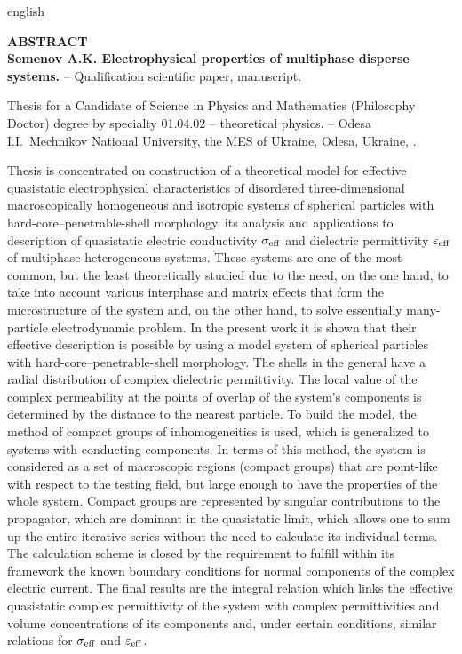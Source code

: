 \begin{otherlanguage*}{english}
\begin{center}
    {\normalfont \textbf{
    	ABSTRACT\\
    	Semenov A.K. Electrophysical properties of multiphase disperse systems.} -- Qualification scientific paper, manuscript.}
\end{center}
\vskip 5pt

Thesis for a Candidate of Science in Physics and Mathematics (Philosophy Doctor) degree by specialty 01.04.02 -- theoretical physics. -- Odesa I.I.~Mechnikov National University, the MES of Ukraine, Odesa, Ukraine, \the\year.

\vskip 5pt

Thesis is concentrated on construction of a theoretical model for effective quasistatic electrophysical characteristics of disordered three-dimensional macroscopically homogeneous and isotropic systems of spherical particles with hard-core--penetrable-shell morphology, its analysis and applications to description of quasistatic electric conductivity $ \sigma_{\rm eff}$ and dielectric permittivity $\varepsilon_ {\rm eff} $ of multiphase heterogeneous systems.
These systems are one of the most common, but the least theoretically studied due to the need, on the one hand, to take into account various interphase and matrix effects that form the microstructure of the system and, on the other hand, to solve essentially many-particle electrodynamic problem.
In the present work it is shown that their effective description is possible by using a model system of spherical particles with hard-core--penetrable-shell morphology. The shells in the general have a radial distribution of complex dielectric permittivity.
The local value of the complex permeability at the points of overlap of the system's components is determined by the distance to the nearest particle.
To build the model, the method of compact groups of inhomogeneities is used, which is generalized to systems with conducting components. In terms of this method, the system is considered as a set of macroscopic regions (compact groups) that are point-like with respect to the testing field, but large enough to have the properties of the whole system.
Compact groups are represented by singular contributions to the propagator, which are dominant in the quasistatic limit, which allows one to sum up the entire iterative series without the need to calculate its individual terms.
The calculation scheme is closed by the requirement to fulfill  within its framework the known boundary conditions for normal components of the complex electric current.
The final results are the integral relation which links the effective quasistatic complex permittivity of the system with complex permittivities and volume concentrations of its components and, under certain conditions, similar relations for $ \sigma_ {\rm eff} $ and $ \varepsilon_ {\rm eff} $.


\end{otherlanguage*}
